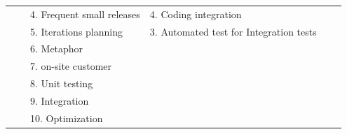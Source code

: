 \documentclass[a4paper,oneside]{bth}
\begin{document}
\begin{longtable}{|p{1.3cm}|p{2cm}|p{2cm}|p{2.7cm}|p{2cm} |p{2cm} |}
				&                                                      & 4. Frequent small releases                                  & 4. Coding integration                                                                               &                                                        &                                                                                              \\ \cline{3-4}
				&                                                      & 5. Iterations planning                                      & 3. Automated test for Integration tests                                                             &                                                        &                                                                                              \\ \cline{3-4}
				&                                                      & 6. Metaphor                                                 & \multirow{6}{*}{}                                                                                   &                                                        &                                                                                              \\ \cline{3-3}
				&                                                      & 7. on-site customer                                         &                                                                                                     &                                                        &                                                                                              \\ \cline{3-3}
				&                                                      & 8. Unit testing                                             &                                                                                                     &                                                        &                                                                                              \\ \cline{3-3}
				&                                                      & 9. Integration                                              &                                                                                                     &                                                        &                                                                                              \\ \cline{3-3}
				&                                                      & 10. Optimization                                            &                                                                                                     &                                                        &                                                                                              \\ \cline{3-3}

\end{longtable}
\end{document}
